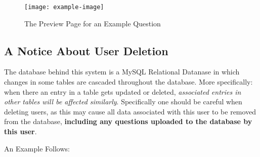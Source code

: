\documentclass[12pt, a4paper, titlepage]{book}
\begin{document}
\begin{figure}[H]
\centering
\texttt{[image: example-image]}
\caption{The Preview Page for an Example Question}
\end{figure}
\begin{appendices}
\addappheadtotoc

\chapter{A Notice About User Deletion}
\small
The database behind this system is a MySQL Relational Datanase in which changes in some tables are cascaded throughout the database. More specifically: when there an entry in a table gets updated or deleted, \emph{associated entries in other tables will be affected similarly}. Specifically one should be careful when deleting users, as this may cause all data associated with this user to be removed from the database, \textbf{including any questions uploaded to the database by this user}.
\\
\par An Example Follows:
\begin{figure}[H]
\centering {}%
    \qquad
    \qquad

\end{figure}
\end{appendices}
\end{document}

